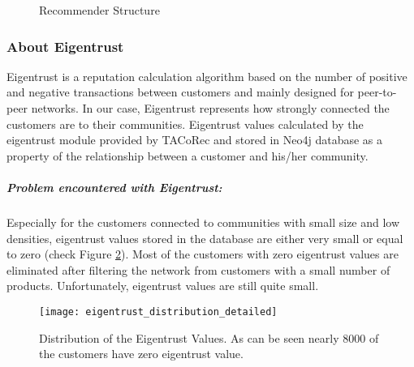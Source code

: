 \label{eigentrust_section}
	\begin{figure}[H]
		\centering
		\caption{Recommender Structure}
		\label{fig:eigentrust_structure}
	\end{figure}
	\subsubsection{About Eigentrust} \label{about_eigentrust}
	Eigentrust\cite{Eigentrust} is a reputation calculation algorithm based on the number of positive and negative transactions between customers and mainly designed for peer-to-peer networks. In our case, Eigentrust represents how strongly connected the customers are to their communities. Eigentrust values calculated by the eigentrust module provided by TACoRec\cite{Tacorec} and stored in Neo4j database as a property of the relationship between a customer and his/her community. 
	\subparagraph{Problem encountered with Eigentrust:}
	Especially for the customers connected to communities with small size and low densities, eigentrust values stored in the database are either very small or equal to zero (check Figure \ref{fig:eigentrust_distribution_figure}). Most of the customers with zero eigentrust values are eliminated after filtering the network from customers with a small number of products. Unfortunately, eigentrust values ​​are still quite small.
	\begin{figure}[H]
		\centering
		\texttt{[image: eigentrust\_distribution\_detailed]}
		\caption{Distribution of the Eigentrust Values. As can be seen nearly 8000 of the customers have zero eigentrust value.}
		\label{fig:eigentrust_distribution_figure}
	\end{figure}

